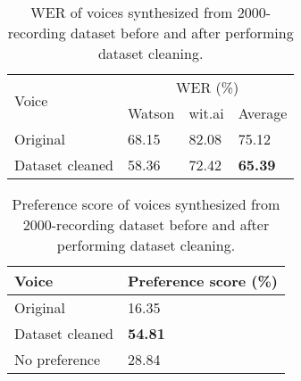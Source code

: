 \documentclass[12pt]{article}
\begin{document}
\begin{table}[]
\begin{center}
\caption{WER of voices synthesized from 2000-recording dataset before and after performing dataset cleaning.}
\label{tab_werCombination2000}
\vspace{3mm}
\begin{tabular}{|l|l|l|l|}
\hline
\multirow{2}{2.5cm}{Voice} &
\multicolumn{3}{c|}{WER (\%)} \\ \cline{2-4}
& Watson & wit.ai & Average \\
\hline
Original        & 68.15 & 82.08 & 75.12 \\
Dataset cleaned & 58.36 & 72.42 & \textbf{65.39} \\
\hline
\end{tabular}
\end{center}
\end{table}

\begin{table}[]
\begin{center}
\caption{Preference score of voices synthesized from 2000-recording dataset before and after performing dataset cleaning.}
\label{tab_subEvaCombination2000}
\vspace{3mm}
\begin{tabular}{|l|l|}
\hline
Voice & Preference score (\%) \\
\hline
Original                & 16.35 \\
Dataset cleaned & \textbf{54.81} \\
No preference           & 28.84 \\
\hline
\end{tabular}
\end{center}
\end{table}
\end{document}
